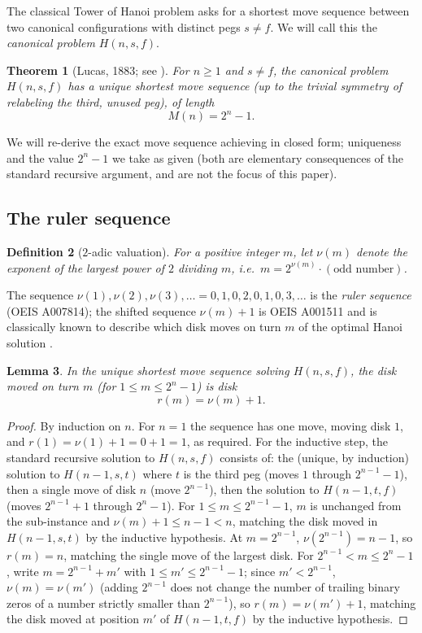 \documentclass[11pt]{article}
\newtheorem{theorem}{Theorem}
\newtheorem{lemma}[theorem]{Lemma}
\newtheorem{definition}[theorem]{Definition}
\begin{document}
The classical Tower of Hanoi problem asks for a shortest move sequence
between two canonical configurations with distinct pegs $s \ne f$. We will
call this the \emph{canonical problem} $H(n, s, f)$.

\begin{theorem}[Lucas, 1883; see \cite{lucas1883,hinz2018}]
\label{thm:classical}
For $n \ge 1$ and $s \ne f$, the canonical problem $H(n,s,f)$ has a unique
shortest move sequence (up to the trivial symmetry of relabeling the third,
unused peg), of length
\[
M(n) = 2^n - 1 .
\]
\end{theorem}

We will re-derive the exact move sequence achieving  in
closed form; uniqueness and the value $2^n - 1$ we take as given (both are
elementary consequences of the standard recursive argument, and are not the
focus of this paper).

\subsection{The ruler sequence}

\begin{definition}[$2$-adic valuation]
For a positive integer $m$, let $\nu(m)$ denote the exponent of the largest
power of $2$ dividing $m$, i.e.\ $m = 2^{\nu(m)} \cdot (\text{odd number})$.
\end{definition}

The sequence $\nu(1), \nu(2), \nu(3), \dots = 0,1,0,2,0,1,0,3,\dots$ is the
\emph{ruler sequence} (OEIS A007814); the shifted sequence $\nu(m)+1$ is
OEIS A001511 and is classically known to describe which disk moves on turn
$m$ of the optimal Hanoi solution \cite{hinz2018}.

\begin{lemma}
\label{lem:ruler}
In the unique shortest move sequence solving $H(n,s,f)$, the disk moved on
turn $m$ (for $1 \le m \le 2^n - 1$) is disk
\[
  r(m) = \nu(m) + 1 .
\]
\end{lemma}

\begin{proof}
By induction on $n$. For $n=1$ the sequence has one move, moving disk $1$,
and $r(1) = \nu(1)+1 = 0+1=1$, as required. For the inductive step, the
standard recursive solution to $H(n,s,f)$ consists of: the (unique,
by induction) solution to $H(n-1,s,t)$ where $t$ is the third peg (moves
$1$ through $2^{n-1}-1$), then a single move of disk $n$ (move
$2^{n-1}$), then the solution to $H(n-1,t,f)$ (moves
$2^{n-1}+1$ through $2^n-1$). For $1 \le m \le 2^{n-1}-1$, $m$ is unchanged
from the sub-instance and $\nu(m)+1 \le n - 1 < n$, matching the disk moved
in $H(n-1,s,t)$ by the inductive hypothesis. At $m = 2^{n-1}$,
$\nu(2^{n-1}) = n-1$, so $r(m) = n$, matching the single move of the largest
disk. For $2^{n-1} < m \le 2^n - 1$, write $m = 2^{n-1} + m'$ with
$1 \le m' \le 2^{n-1}-1$; since $m' < 2^{n-1}$, $\nu(m) = \nu(m')$ (adding
$2^{n-1}$ does not change the number of trailing binary zeros of a number
strictly smaller than $2^{n-1}$), so $r(m) = \nu(m')+1$, matching the disk
moved at position $m'$ of $H(n-1,t,f)$ by the inductive hypothesis.
\end{proof}
\end{document}
